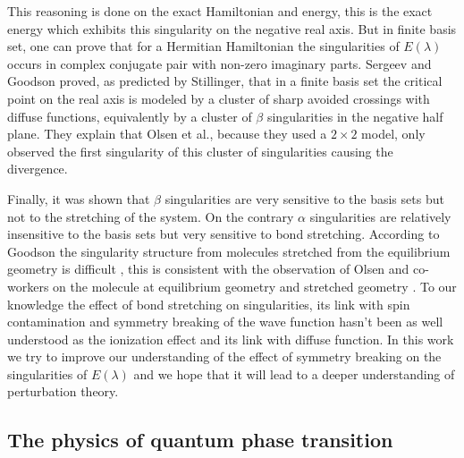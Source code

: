 \documentclass[11pt,a4paper]{article}
\begin{document}
This reasoning is done on the exact Hamiltonian and energy, this is the exact energy which exhibits this singularity on the negative real axis. But in finite basis set, one can prove that for a Hermitian Hamiltonian the singularities of $E(\lambda)$ occurs in complex conjugate pair with non-zero imaginary parts. Sergeev and Goodson proved, as predicted by Stillinger, that in a finite basis set the critical point on the real axis is modeled by a cluster of sharp avoided crossings with diffuse functions, equivalently by a cluster of $\beta$ singularities in the negative half plane. They explain that Olsen et al., because they used a $2\times2$ model, only observed the first singularity of this cluster of singularities causing the divergence.

Finally, it was shown that $\beta$ singularities are very sensitive to the basis sets but not to the stretching of the system. On the contrary $\alpha$ singularities are relatively insensitive to the basis sets but very sensitive to bond stretching. According to Goodson the singularity structure from molecules stretched from the equilibrium geometry is difficult \cite{Goodson_2004}, this is consistent with the observation of Olsen and co-workers on the  molecule at equilibrium geometry and stretched geometry \cite{Olsen_2000}. To our knowledge the effect of bond stretching on singularities, its link with spin contamination and symmetry breaking of the wave function hasn't been as well understood as the ionization effect and its link with diffuse function. In this work we try to improve our understanding of the effect of symmetry breaking on the singularities of $E(\lambda)$ and we hope that it will lead to a deeper understanding of perturbation theory.

\subsection{The physics of quantum phase transition}
\end{document}
